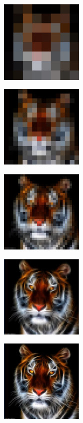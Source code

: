\documentclass[twocolumn,12pt]{article}
\begin{document}
\begin{figure}[ht!]
\centering
\includegraphics[width=40mm]{tig2.jpg}
\end{figure}\begin{figure}[ht!]
\centering
\includegraphics[width=40mm]{tig3.jpg}
\end{figure}
\begin{figure}[ht!]
\centering
\includegraphics[width=40mm]{tig4.jpg}
\end{figure}
\begin{figure}[ht!]
\centering
\includegraphics[width=40mm]{tig5.jpg}
\end{figure}
\begin{figure}[ht!]
\centering
\includegraphics[width=40mm]{tig6.jpg}
\end{figure}
\end{document}
